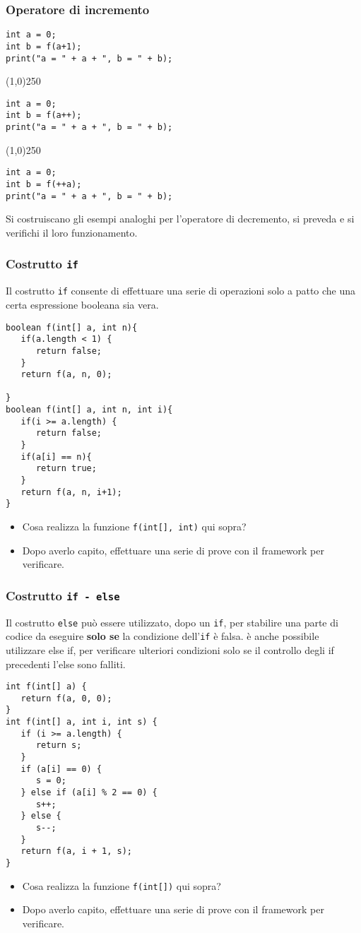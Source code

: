 \documentclass{beamer}
\begin{document}
\begin{frame}[fragile]
\frametitle{Operatore di incremento}
\scriptsize
\begin{verbatim}
int a = 0;
int b = f(a+1);
print("a = " + a + ", b = " + b);
\end{verbatim}
\line(1,0){250}
\begin{verbatim}
int a = 0;
int b = f(a++);
print("a = " + a + ", b = " + b);
\end{verbatim}
\line(1,0){250}
\begin{verbatim}
int a = 0;
int b = f(++a);
print("a = " + a + ", b = " + b);
\end{verbatim}
Si costruiscano gli esempi analoghi per l'operatore di decremento, si preveda e si verifichi il loro funzionamento.
\end{frame}

\begin{frame}[fragile]
\frametitle{Costrutto \texttt{if}}
Il costrutto \texttt{if} consente di effettuare una serie di operazioni solo a patto che una certa espressione booleana sia vera.
\scriptsize
\begin{verbatim}
boolean f(int[] a, int n){
   if(a.length < 1) {
      return false;
   }
   return f(a, n, 0);

}
boolean f(int[] a, int n, int i){
   if(i >= a.length) {
      return false;
   }
   if(a[i] == n){
      return true;
   }
   return f(a, n, i+1);
}
\end{verbatim}
\normalsize
\begin{itemize}
 \item Cosa realizza la funzione \texttt{f(int[], int)} qui sopra?
 \item Dopo averlo capito, effettuare una serie di prove con il framework per verificare. 
\end{itemize}
\end{frame}

\begin{frame}[fragile]
\frametitle{Costrutto \texttt{if - else}}
Il costrutto \texttt{else} può essere utilizzato, dopo un \texttt{if}, per stabilire una parte di codice da eseguire \textbf{solo se} la condizione dell'\texttt{if} è falsa. è anche possibile utilizzare else if, per verificare ulteriori condizioni solo se il controllo degli if precedenti l'else sono falliti.
\scriptsize
\begin{verbatim}
int f(int[] a) {
   return f(a, 0, 0);
}
int f(int[] a, int i, int s) {
   if (i >= a.length) {
      return s;
   }
   if (a[i] == 0) {
      s = 0;
   } else if (a[i] % 2 == 0) {
      s++;
   } else {
      s--;
   }
   return f(a, i + 1, s);
}
\end{verbatim}
\normalsize
\begin{itemize}
 \item Cosa realizza la funzione \texttt{f(int[])} qui sopra?
 \item Dopo averlo capito, effettuare una serie di prove con il framework per verificare. 
\end{itemize}
\end{frame}
\end{document}
